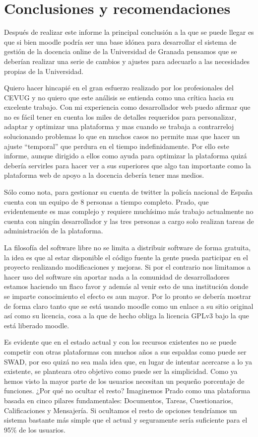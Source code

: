 \chapter{Conclusiones y recomendaciones}

Después de realizar este informe la principal conclusión a la que se puede llegar es que si bien moodle podría ser una base idónea para desarrollar el sistema de gestión de la docencia online de la Universidad de Granada pensamos que se deberían realizar una serie de cambios y ajustes para adecuarlo a las necesidades propias de la Universidad.

\bigskip
Quiero hacer hincapié en el gran esfuerzo realizado por los profesionales del CEVUG y no quiero que este análisis se entienda como una crítica hacia su excelente trabajo. Con mi experiencia como desarrollador web puedo afirmar que no es fácil tener en cuenta los miles de detalles requeridos para personalizar, adaptar y optimizar una plataforma y mas cuando se trabaja a contrarreloj solucionando problemas lo que en muchos casos no permite mas que hacer un ajuste ``temporal'' que perdura en el tiempo indefinidamente. Por ello este informe, aunque dirigido a ellos como ayuda para optimizar la plataforma quizá debería servirles para hacer ver a sus superiores que algo tan importante como la plataforma web de apoyo a la docencia debería tener mas medios.

\bigskip
Sólo como nota, para gestionar su cuenta de twitter la policía nacional de España cuenta con un equipo de 8 personas a tiempo completo. Prado, que evidentemente es mas complejo y requiere muchísimo más trabajo actualmente no cuenta con ningún desarrollador y las tres personas a cargo solo realizan tareas de administración de la plataforma.

\bigskip
La filosofía del software libre no se limita a distribuir software de forma gratuita, la idea es que al estar disponible el código fuente la gente pueda participar en el proyecto realizando modificaciones y mejoras. Si por el contrario nos limitamos a hacer uso del software sin aportar nada a la comunidad de desarrolladores estamos haciendo un flaco favor y además al venir esto de una institución donde se imparte conocimiento el efecto es aun mayor. Por lo pronto se debería mostrar de forma claro tanto que se está usando moodle como un enlace a su sitio original así como su licencia, cosa a la que de hecho obliga la licencia GPLv3 bajo la que está liberado moodle.

\bigskip
Es evidente que en el estado actual y con los recursos existentes no se puede competir con otras plataformas con muchos años a sus espaldas como puede ser SWAD, por eso quizá no sea mala idea que, en lugar de intentar acercarse a lo ya existente, se planteara otro objetivo como puede ser la simplicidad. Como ya hemos visto la mayor parte de los usuarios necesitan un pequeño porcentaje de funciones. ¿Por qué no ocultar el resto? Imaginemos Prado como una plataforma basada en cinco pilares fundamentales: Documentos, Tareas, Cuestionarios, Calificaciones y Mensajería. Si ocultamos el resto de opciones tendríamos un sistema bastante más simple que el actual y seguramente sería suficiente para el 95\% de los usuarios.

